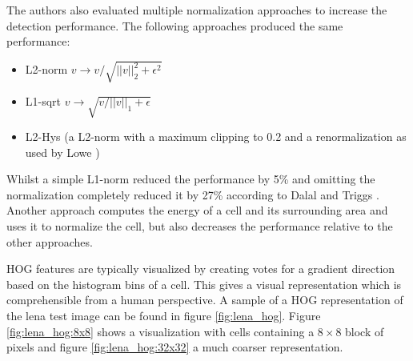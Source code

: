 The authors also evaluated multiple normalization approaches to increase the detection performance.
The following approaches produced the same performance:
\begin{itemize}
	\item L2-norm $v \rightarrow v / \sqrt{||v||_2^2 + \epsilon^2}$
	\item L1-sqrt $v \rightarrow \sqrt{v / ||v||_1 + \epsilon}$
	\item L2-Hys (a L2-norm with a maximum clipping to 0.2 and a renormalization as used by Lowe \cite{Lowe2004})%
\end{itemize}
Whilst a simple L1-norm reduced the performance by 5\% and omitting the normalization completely reduced it by 27\% according to Dalal and Triggs \cite{Dalal2005}. Another approach computes the energy of a cell and its surrounding area and uses it to normalize the cell, but also decreases the performance relative to the other approaches.

\ac{HOG} features are typically visualized by creating votes for a gradient direction based on the histogram bins of a cell. This gives a visual representation which is comprehensible from a human perspective. A sample of a \ac{HOG} representation of the lena test image can be found in figure \ref{fig:lena_hog}. Figure \ref{fig:lena_hog:8x8} shows a visualization with cells containing a $8\times8$ block of pixels and figure \ref{fig:lena_hog:32x32} a much coarser representation.

